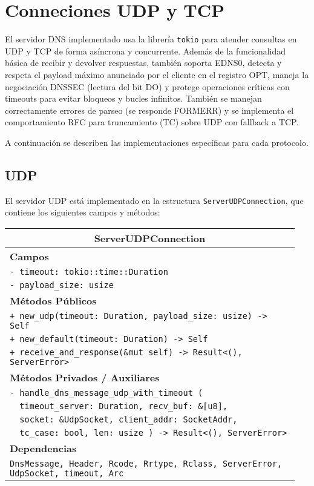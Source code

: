 \chapter{Conneciones UDP y TCP}

El servidor DNS implementado usa la librería \texttt{tokio} para atender consultas en UDP y TCP de forma asíncrona y concurrente. 
Además de la funcionalidad básica de recibir y devolver respuestas, también soporta EDNS0, detecta y respeta el payload máximo 
anunciado por el cliente en el registro OPT, maneja la negociación DNSSEC (lectura del bit DO) y protege operaciones críticas
con timeouts para evitar bloqueos y bucles infinitos. También se manejan correctamente errores de parseo (se responde FORMERR) y
se implementa el comportamiento RFC para truncamiento (TC) sobre UDP con fallback a TCP.

A continuación se describen las implementaciones específicas para cada protocolo.

\newpage

\section{UDP}

El servidor UDP está implementado en la estructura \texttt{ServerUDPConnection}, que contiene los siguientes campos y métodos:

\begin{table}[h!]
\centering
\renewcommand{\arraystretch}{1.3}
\begin{tabular}{|p{0.95\linewidth}|}
\hline
\multicolumn{1}{|c|}{\textbf{ServerUDPConnection}} \\
\hline
\textbf{Campos} \\
\hline
\texttt{- timeout: tokio::time::Duration} \\
\texttt{- payload\_size: usize} \\
\hline
\textbf{Métodos Públicos} \\
\hline
\texttt{+ new\_udp(timeout: Duration, payload\_size: usize) -> Self} \\
\texttt{+ new\_default(timeout: Duration) -> Self} \\
\texttt{+ receive\_and\_response(\&mut self) -> Result<(), ServerError>} \\
\hline
\textbf{Métodos Privados / Auxiliares} \\
\hline
\texttt{- handle\_dns\_message\_udp\_with\_timeout (} \\
\texttt{\ \ timeout\_server: Duration, recv\_buf: \&[u8],} \\
\texttt{\ \ socket: \&UdpSocket, client\_addr: SocketAddr,} \\
\texttt{\ \ tc\_case: bool, len: usize ) ->  Result<(), ServerError>} \\
\hline
\textbf{Dependencias} \\
\hline
\texttt{DnsMessage, Header, Rcode, Rrtype, Rclass, ServerError, UdpSocket, timeout, Arc} \\
\hline
\end{tabular}
\end{table}

